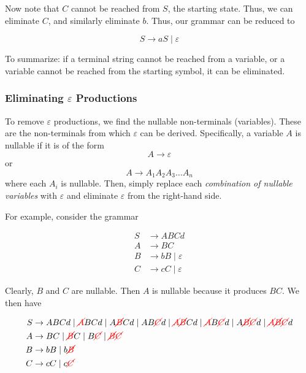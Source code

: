 Now note that \(C\) cannot be reached from \(S\), the starting state. Thus, we can eliminate \(C\), and similarly eliminate \(b\). Thus, our grammar can be reduced to 

\[S \to aS\mid \varepsilon \]

To summarize: if a terminal string cannot be reached from a variable, or a variable cannot be reached from the starting symbol, it can be eliminated.

\subsubsection{Eliminating \texorpdfstring{\(\varepsilon \)}{e} Productions}\label{subsubsec:eliminating-epsilon-productions}

To remove \(\varepsilon \) productions, we find the nullable non-terminals (variables). These are the non-terminals from which \(\varepsilon \) can be derived. Specifically, a variable \(A\) is nullable if it is of the form \[A\to\varepsilon \] or \[A\to A_1A_2A_3\hdots A_n\] where each \(A_i\) is nullable. Then, simply replace each \textit{combination of nullable variables} with \(\varepsilon \) and eliminate \(\varepsilon \) from the right-hand side. 

For example, consider the grammar

\begin{align*}
    S &\to ABCd\\
    A &\to BC\\
    B &\to bB \mid \varepsilon \\
    C &\to cC \mid \varepsilon
\end{align*}

Clearly, \(B\) and \(C\) are nullable. Then \(A\) is nullable because it produces \(BC\). We then have 

\begin{align*}
    S &\to ABCd \mid {\color{red}\cancel{A}}BCd \mid A{\color{red}\cancel{B}}Cd \mid AB{\color{red}\cancel{C}}d \mid {\color{red}\cancel{A}}{\color{red}\cancel{B}}Cd \mid {\color{red}\cancel{A}}B{\color{red}\cancel{C}}d \mid A{\color{red}\cancel{B}}{\color{red}\cancel{C}}d \mid {\color{red}\cancel{A}}{\color{red}\cancel{B}}{\color{red}\cancel{C}}d \\
    A &\to BC \mid {\color{red}\cancel{B}}C \mid B{\color{red}\cancel{C}} \mid {\color{red}\cancel{B}}{\color{red}\cancel{C}}\\
    B &\to bB \mid b{\color{red}\cancel{B}} \\
    C &\to cC \mid c{\color{red}\cancel{C}}
\end{align*}

